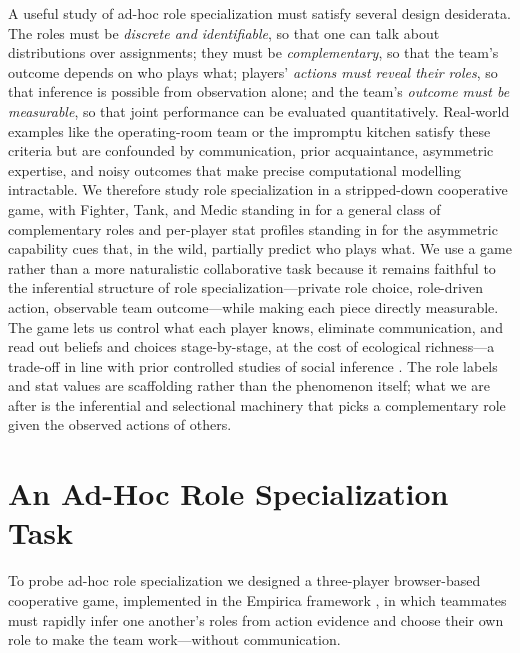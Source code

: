 \documentclass[9pt,twocolumn,twoside]{pnas-new}
\begin{document}
A useful study of ad-hoc role specialization must satisfy several
design desiderata. The roles must be \emph{discrete and identifiable},
so that one can talk about distributions over assignments; they must
be \emph{complementary}, so that the team's outcome depends on who
plays what; players' \emph{actions must reveal their roles}, so that
inference is possible from observation alone; and the team's
\emph{outcome must be measurable}, so that joint performance can be
evaluated quantitatively. Real-world examples like the operating-room
team or the impromptu kitchen satisfy these criteria but are
confounded by communication, prior acquaintance, asymmetric expertise,
and noisy outcomes that make precise computational modelling
intractable. We therefore study role specialization in a stripped-down
cooperative game, with Fighter, Tank, and Medic standing in for a
general class of complementary roles and per-player stat profiles
standing in for the asymmetric capability cues that, in the wild,
partially predict who plays what. We use a game rather than a more
naturalistic collaborative task because it remains faithful to the
inferential structure of role specialization---private role choice,
role-driven action, observable team outcome---while making each piece
directly measurable. The game lets us control what each player knows,
eliminate communication, and read out beliefs and choices
stage-by-stage, at the cost of ecological richness---a trade-off in
line with prior controlled studies of social inference
\cite{baker2017rational, lambaBayesianCoordination}. The role labels
and stat values are scaffolding rather than the phenomenon itself;
what we are after is the inferential and selectional machinery that
picks a complementary role given the observed actions of others.

\section*{An Ad-Hoc Role Specialization Task}\label{sec:task}

To probe ad-hoc role specialization we designed a three-player
browser-based cooperative game, implemented in the Empirica framework
\cite{empirica2021}, in which teammates must rapidly infer one
another's roles from action evidence and choose their own role to
make the team work---without communication.
\end{document}
